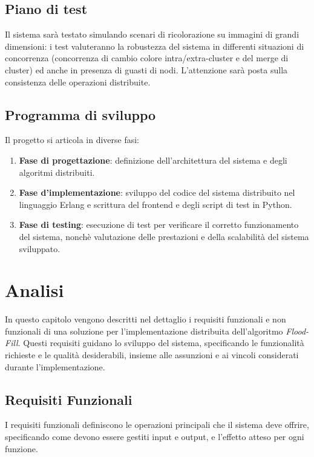\documentclass[12pt, a4paper]{report}
\begin{document}
\section{Piano di test}

Il sistema sar\`a testato simulando scenari di ricolorazione su immagini di grandi dimensioni: i test valuteranno la robustezza del sistema in differenti situazioni di concorrenza (concorrenza di cambio colore intra/extra-cluster e del merge di cluster) ed anche in presenza di guasti di nodi. L'attenzione sar\`a posta sulla consistenza delle operazioni distribuite.

\section{Programma di sviluppo}

Il progetto si articola in diverse fasi:
\begin{enumerate}
    \item \textbf{Fase di progettazione}: definizione dell'architettura del sistema e degli algoritmi distribuiti.
    \item \textbf{Fase d'implementazione}: sviluppo del codice del sistema distribuito nel linguaggio Erlang e scrittura del frontend e degli script di test in Python.
    \item \textbf{Fase di testing}: esecuzione di test per verificare il corretto funzionamento del sistema, nonch\`e valutazione delle prestazioni e della scalabilit\`a del sistema sviluppato.
\end{enumerate}

\chapter{Analisi}\label{chapter:analisi}

In questo capitolo vengono descritti nel dettaglio i requisiti funzionali e non funzionali di una soluzione per l'implementazione distribuita dell'algoritmo \emph{Flood-Fill}. Questi requisiti guidano lo sviluppo del sistema, specificando le funzionalit\`a richieste e le qualit\`a desiderabili, insieme alle assunzioni e ai vincoli considerati durante l'implementazione.

\section{Requisiti Funzionali}

I requisiti funzionali definiscono le operazioni principali che il sistema deve offrire, specificando come devono essere gestiti input e output, e l'effetto atteso per ogni funzione.
\end{document}

